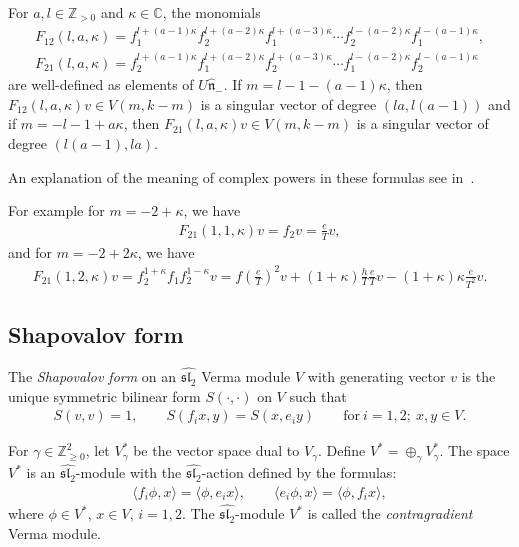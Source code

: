 \begin{thm}\label{thm MFF} For $a, l\in{\mathbb Z}_{>0}$ and $\kappa\in {\mathbb C}$, the monomials
\begin{gather*}
F_{12}(l,a,\kappa) = f_1^{l+(a-1)\kappa}f_2^{l+(a-2)\kappa} f_1^{l+(a-3)\kappa}\cdots f_2^{l-(a-2)\kappa} f_1^{l-(a-1)\kappa}, \\ %
F_{21}(l,a,\kappa) = f_2^{l+(a-1)\kappa}f_1^{l+(a-2)\kappa} f_2^{l+(a-3)\kappa}\cdots f_1^{l-(a-2)\kappa} f_2^{l-(a-1)\kappa} \nonumber
\end{gather*}
are well-defined as elements of $U\hat{\mathfrak{n}}_-$. If $m=l-1-(a-1)\kappa$, then $F_{12}(l,a,\kappa)v\in V(m,k-m)$ is a singular vector of degree $(la,l(a-1))$ and if $m=-l-1+a\kappa$, then $F_{21}(l,a,\kappa)v\in V(m,k-m)$ is a singular vector of degree $(l(a-1),la)$.
\end{thm}

An explanation of the meaning of complex powers in these formulas see in~\cite{MFF}.

For example for $m=-2+\kappa$, we have
\begin{gather*}
F_{21}(1,1,\kappa)v=f_2v=\frac{e}{T}v,
\end{gather*}
and for $m=-2+2\kappa$, we have
\begin{gather*}
F_{21}(1,2,\kappa)v=f_2^{1+\kappa} f_1f_2^{1-\kappa}v=f\left(\frac{e}{T}\right)^2 v+(1+\kappa)\frac{h}{T} \frac{e}{T}v-(1+\kappa)\kappa\frac{e}{T^2}v.
\end{gather*}

\subsection{Shapovalov form}\label{contra}
The {\em Shapovalov form} on an $\widehat{{\mathfrak{sl}_2}}$ Verma module $V$ with generating vector $v$ is the unique symmetric bilinear form $S(\cdot,\cdot)$ on $V$ such that
\begin{gather*}
S(v,v)=1,\qquad S(f_ix,y)=S(x,e_iy) \qquad \text{for} \ i=1,2;\ x,y\in V.
\end{gather*}

For $\gamma\in{\mathbb Z}^2_{\geq 0}$, let $V^*_{\gamma}$ be the vector space dual to $V_{\gamma}$. Define $V^*=\oplus_\gamma V_{\gamma}^*$. The space $V^*$ is an $\widehat{{\mathfrak{sl}_2}}$-module with the $\widehat{{\mathfrak{sl}_2}}$-action defined by the formulas:
\begin{gather*}
\langle f_i\phi,x\rangle=\langle \phi,e_ix\rangle, \qquad \langle e_i\phi,x\rangle=\langle\phi,f_ix\rangle ,
\end{gather*}
where $\phi\in V^*$, $x\in V$, $i=1,2 $. The $\widehat{{\mathfrak{sl}_2}}$-module $V^*$ is called the {\em contragradient} Verma module.

